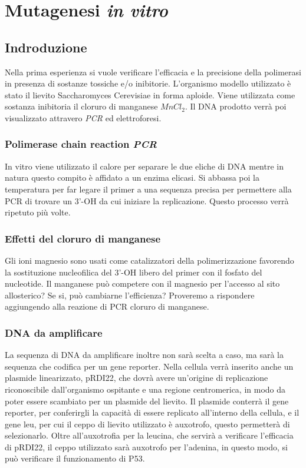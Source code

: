 \section*{Mutagenesi \emph{in vitro}}

	\subsection*{Indroduzione}
        Nella prima esperienza si vuole verificare l'efficacia e la precisione della polimerasi in presenza di sostanze tossiche e/o inibitorie.
        L'organismo modello utilizzato è stato il lievito Saccharomyces Cerevisiae in forma aploide.
	Viene utilizzata come sostanza inibitoria il cloruro di manganese \emph{$MnCl_2$}.
	Il DNA prodotto verr\`a poi visualizzato attravero \emph{PCR} ed elettroforesi.
        
		\subsubsection*{Polimerase chain reaction \emph{PCR}}
		In vitro viene utilizzato il calore per separare le due eliche di DNA mentre in natura questo compito è affidato a un enzima elicasi. 
       		 Si abbassa poi la temperatura per far legare il primer a una sequenza precisa per permettere alla PCR di trovare un 3'-OH da cui iniziare la replicazione.
        	Questo processo verrà ripetuto più volte.

		\subsubsection*{Effetti del cloruro di manganese}
        	Gli ioni magnesio sono usati come catalizzatori della polimerizzazione favorendo la sostituzione nucleofilica del 3'-OH libero del primer con il fosfato del nucleotide.
        	Il manganese può competere con il magnesio per l'accesso al sito allosterico? Se si, può cambiarne l'efficienza?
        	Proveremo a rispondere aggiungendo alla reazione di PCR cloruro di manganese.

		\subsubsection*{DNA da amplificare}
        	La sequenza di DNA da amplificare inoltre non sarà scelta a caso, ma sarà la sequenza che codifica per un gene reporter.
		Nella cellula verrà inserito anche un plasmide linearizzato, pRDI22, che dovrà avere un'origine di replicazione riconoscibile dall'organismo ospitante e una regione centromerica, in modo da poter essere scambiato per un plasmide del lievito.
        	Il plasmide conterrà il gene reporter, per conferirgli la capacità di essere replicato all'interno della cellula, e il gene leu, per cui il ceppo di lievito utilizzato è auxotrofo, questo permetterà di selezionarlo.
        	Oltre all'auxotrofia per la leucina, che servirà a verificare l'efficacia di pRDI22, il ceppo utilizzato sarà auxotrofo per l'adenina, in questo modo, si può verificare il funzionamento di P53.

